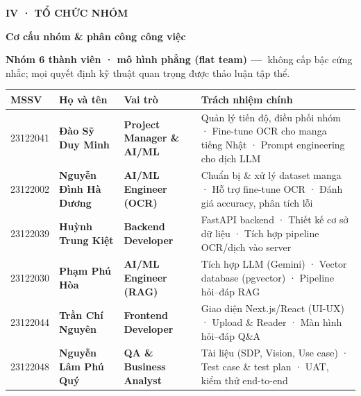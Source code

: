 \documentclass[aspectratio=169,10pt]{beamer}
\newcommand{\kick}[1]{{\headfont\bfseries\footnotesize\textcolor{mred}{\MakeUppercase{#1}}}}
\newcommand{\slidehead}[2]{%
  \kick{#1}\par\vspace{0.6mm}%
  {\headfont\bfseries\LARGE\textcolor{ink}{#2}}\par\vspace{1.2mm}}
\begin{document}
\begin{frame}
\slidehead{IV · Tổ chức nhóm}{Cơ cấu nhóm \& phân công công việc}
\vspace{0.5mm}
{\footnotesize{\headfont\bfseries Nhóm 6 thành viên · mô hình phẳng (flat team) —\ }\textcolor{slate}{không cấp bậc cứng nhắc; mọi quyết định kỹ thuật quan trọng được thảo luận tập thể.}}\par\vspace{2mm}
\renewcommand{\arraystretch}{1.35}
\scriptsize
\begin{tabular}{|>{\raggedright\arraybackslash}p{1.15cm}|>{\raggedright\arraybackslash}p{2.5cm}|>{\raggedright\arraybackslash}p{2.9cm}|>{\raggedright\arraybackslash}p{5.7cm}|}
\hline
\rowcolor{ink}
{\color{white}\headfont\bfseries MSSV} & {\color{white}\headfont\bfseries Họ và tên} & {\color{white}\headfont\bfseries Vai trò} & {\color{white}\headfont\bfseries Trách nhiệm chính}\\
\hline
\textcolor{slate}{23122041} & {\headfont\bfseries Đào Sỹ Duy Minh} & {\headfont\bfseries\color{mred}Project Manager \& AI/ML} & \textcolor{ink2}{Quản lý tiến độ, điều phối nhóm · Fine-tune OCR cho manga tiếng Nhật · Prompt engineering cho dịch LLM}\\
\hline
\rowcolor{cream}
\textcolor{slate}{23122002} & {\headfont\bfseries Nguyễn Đình Hà Dương} & {\headfont\bfseries\color{mred}AI/ML Engineer (OCR)} & \textcolor{ink2}{Chuẩn bị \& xử lý dataset manga · Hỗ trợ fine-tune OCR · Đánh giá accuracy, phân tích lỗi}\\
\hline
\textcolor{slate}{23122039} & {\headfont\bfseries Huỳnh Trung Kiệt} & {\headfont\bfseries\color{ink}Backend Developer} & \textcolor{ink2}{FastAPI backend · Thiết kế cơ sở dữ liệu · Tích hợp pipeline OCR/dịch vào server}\\
\hline
\rowcolor{cream}
\textcolor{slate}{23122030} & {\headfont\bfseries Phạm Phú Hòa} & {\headfont\bfseries\color{mgreen}AI/ML Engineer (RAG)} & \textcolor{ink2}{Tích hợp LLM (Gemini) · Vector database (pgvector) · Pipeline hỏi–đáp RAG}\\
\hline
\textcolor{slate}{23122044} & {\headfont\bfseries Trần Chí Nguyên} & {\headfont\bfseries\color{mblue}Frontend Developer} & \textcolor{ink2}{Giao diện Next.js/React (UI-UX) · Upload \& Reader · Màn hình hỏi–đáp Q\&A}\\
\hline
\rowcolor{cream}
\textcolor{slate}{23122048} & {\headfont\bfseries Nguyễn Lâm Phú Quý} & {\headfont\bfseries\color{gold}QA \& Business Analyst} & \textcolor{ink2}{Tài liệu (SDP, Vision, Use case) · Test case \& test plan · UAT, kiểm thử end-to-end}\\
\hline
\end{tabular}
\end{frame}
\end{document}
